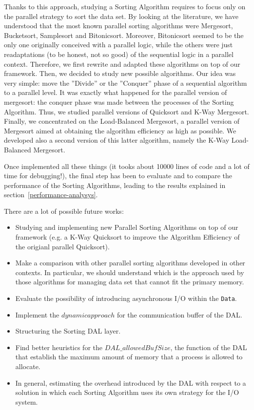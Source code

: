 Thanks to this approach, studying a Sorting Algorithm requires to focus only on the parallel strategy to sort the data set. By looking at the literature, we have understood that the most known parallel sorting algorithms were Mergesort, Bucketsort, Samplesort and Bitonicsort. Moreover, Bitonicsort seemed to be the only one originally conceived with a parallel logic, while the others were just readaptations (to be honest, not so good) of the sequential logic in a parallel context. Therefore, we first rewrite and adapted these algorithms on top of our framework. Then, we decided to study new possible algorithms. Our idea was very simple: move the ''Divide'' or the ''Conquer'' phase of a sequential algorithm to a parallel level. It was exactly what happened for the parallel version of mergesort: the conquer phase was made between the processes of the Sorting Algorithm. Thus, we studied parallel versions of Quicksort and K-Way Mergesort. Finally, we concentrated on the Load-Balanced Mergesort, a parallel version of Mergesort aimed at obtaining the algorithm efficiency as high as possible. We developed also a second version of this latter algorithm, namely the K-Way Load-Balanced Mergesort. 

Once implemented all these things (it tooks about 10000 lines of code and a lot of time for debugging!), the final step has been to evaluate and to compare the performance of the Sorting Algorithms, leading to the results explained in section~\ref{performance-analysys}. 

There are a lot of possible future works:  
\begin{itemize}
\item Studying and implementing new Parallel Sorting Algorithms on top of our framework (e.g. a K-Way Quicksort to improve the Algorithm Efficiency of the origianl parallel Quicksort).
\item Make a comparison with other parallel sorting algorithms developed in other contexts. In particular, we should understand which is the approach used by those algorithms for managing data set that cannot fit the primary memory.
\item Evaluate the possibility of introducing asynchronous I/O within the \texttt{Data}. 
\item Implement the $dynamic approach$ for the communication buffer of the DAL.
\item Structuring the Sorting DAL layer.
\item Find better heuristics for the $DAL\_allowedBufSize$, the function of the DAL that establish the maximum amount of memory that a process is allowed to allocate.
\item In general, estimating the overhead introduced by the DAL with respect to a solution in which each Sorting Algorithm uses its own strategy for the I/O system.
\end{itemize}